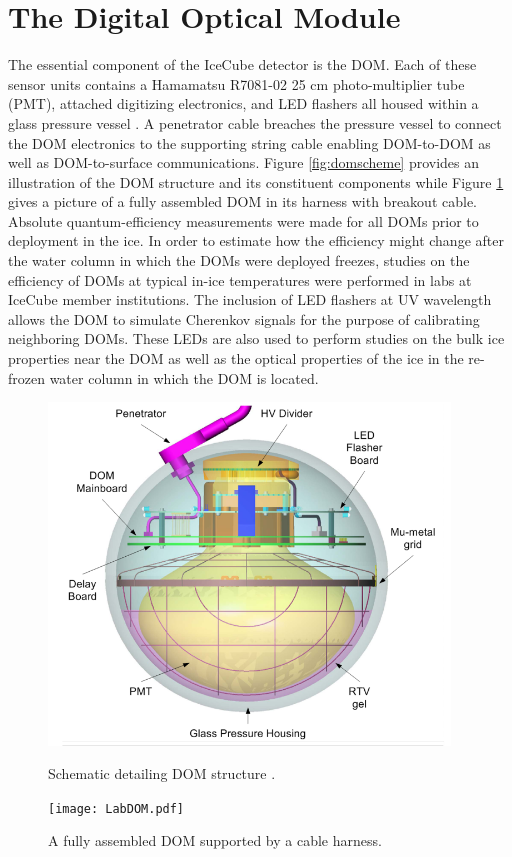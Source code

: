 \documentclass{gatech-thesis}
\begin{document}
\section{The Digital Optical Module}
The essential component of the IceCube detector is the DOM. Each of these sensor units contains a Hamamatsu R7081-02 25 cm photo-multiplier tube (PMT), attached digitizing electronics, and LED flashers all housed within a glass pressure vessel \cite{2006NIMPA.567..214H}. A penetrator cable breaches the pressure vessel to connect the DOM electronics to the supporting string cable enabling DOM-to-DOM as well as DOM-to-surface communications. Figure \ref{fig:domscheme} provides an illustration of the DOM structure and its constituent components while Figure \ref{fig:dompic} gives a picture of a fully assembled DOM in its harness with breakout cable. Absolute quantum-efficiency measurements were made for all DOMs prior to deployment in the ice. In order to estimate how the efficiency might change after the water column in which the DOMs were deployed freezes, studies on the efficiency of DOMs at typical in-ice temperatures were performed in labs at IceCube member institutions. The inclusion of LED flashers at UV wavelength allows the DOM to simulate Cherenkov signals for the purpose of calibrating neighboring DOMs. These LEDs are also used to perform studies on the bulk ice properties near the DOM as well as the optical properties of the ice in the re-frozen water column in which the DOM is located.

\begin{figure}[ht]
\centering
\begin{minipage}[b]{0.45\linewidth}
\includegraphics[width=0.95\textwidth]{DomSchematic.png}
\caption{Schematic detailing DOM structure \cite{2009NIMPA.601..294A}.}
\label{fig:domscheme}
\end{minipage}
\quad
\begin{minipage}[b]{0.45\linewidth}
\begin{center}
\texttt{[image: LabDOM.pdf]}
\end{center}
\caption{A fully assembled DOM supported by a cable harness.}
\label{fig:dompic}
\end{minipage}
\end{figure}
\end{document}
